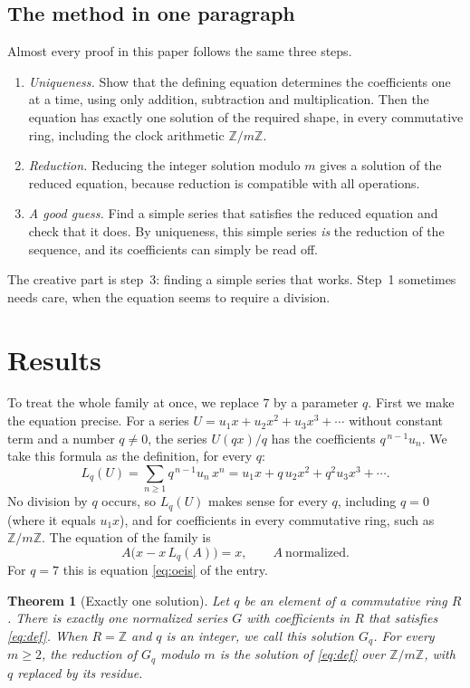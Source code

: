\documentclass[11pt,a4paper]{article}
\newtheorem{theorem}{Theorem}[section]
\theoremstyle{definition}
\theoremstyle{remark}
\newcommand{\Z}{\mathbb{Z}}
\begin{document}
\subsection{The method in one paragraph}
Almost every proof in this paper follows the same three steps.
\begin{enumerate}
\item \emph{Uniqueness.} Show that the defining equation determines the coefficients one at a time, using only
addition, subtraction and multiplication. Then the equation has exactly one solution of the required shape, in every
commutative ring, including the clock arithmetic $\Z/m\Z$.
\item \emph{Reduction.} Reducing the integer solution modulo $m$ gives a solution of the reduced equation,
because reduction is compatible with all operations.
\item \emph{A good guess.} Find a simple series that satisfies the reduced equation and check that it does. By uniqueness,
this simple series \emph{is} the reduction of the sequence, and its coefficients can simply be read off.
\end{enumerate}
The creative part is step~3: finding a simple series that works. Step~1 sometimes needs care, when the equation seems to
require a division.

\section{Results}\label{sec:results}

To treat the whole family at once, we replace $7$ by a parameter $q$. First we make the equation
precise. For a series $U=u_1x+u_2x^2+u_3x^3+\cdots$ without constant term and a number $q\ne0$, the series $U(qx)/q$
has the coefficients $q^{\,n-1}u_n$. We take this formula as the definition, for every $q$:
\begin{equation}\label{eq:L}
L_q(U)=\sum_{n\ge1}q^{\,n-1}u_n\,x^n=u_1x+q\,u_2x^2+q^2u_3x^3+\cdots .
\end{equation}
No division by $q$ occurs, so $L_q(U)$ makes sense for every $q$, including $q=0$ (where it equals $u_1x$), and for
coefficients in every commutative ring, such as $\Z/m\Z$. The equation of the family is
\begin{equation}\label{eq:def}
A\bigl(x-x\,L_q(A)\bigr)=x,\qquad A\ \text{normalized}.
\end{equation}
For $q=7$ this is equation \eqref{eq:oeis} of the entry.

\begin{theorem}[Exactly one solution]\label{thm:exist}
Let $q$ be an element of a commutative ring $R$. There is exactly one normalized series $G$ with coefficients in $R$
that satisfies \eqref{eq:def}. When $R=\Z$ and $q$ is an integer, we call this solution $G_q$. For every $m\ge2$, the
reduction of $G_q$ modulo $m$ is the solution of \eqref{eq:def} over $\Z/m\Z$, with $q$ replaced by its residue.
\end{theorem}
\end{document}
